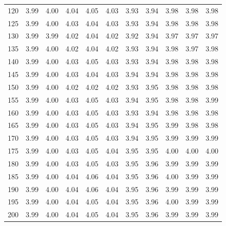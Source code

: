 \documentclass[preprint,12pt]{elsarticle}
\begin{document}
\begin{table}[ht]
\begin{tabular}{c|ccccc|ccccc}
  120 & 3.99 & 4.00 & 4.04 & 4.05 & 4.03 & 3.93 & 3.94 & 3.98 & 3.98 & 3.98 \\ 
  125 & 3.99 & 4.00 & 4.03 & 4.04 & 4.03 & 3.93 & 3.94 & 3.98 & 3.98 & 3.98 \\ 
  130 & 3.99 & 3.99 & 4.02 & 4.04 & 4.02 & 3.92 & 3.94 & 3.97 & 3.97 & 3.97 \\ 
  135 & 3.99 & 4.00 & 4.02 & 4.04 & 4.02 & 3.93 & 3.94 & 3.98 & 3.97 & 3.98 \\ 
  140 & 3.99 & 4.00 & 4.03 & 4.05 & 4.03 & 3.93 & 3.94 & 3.98 & 3.98 & 3.98 \\ 
  145 & 3.99 & 4.00 & 4.03 & 4.04 & 4.03 & 3.94 & 3.94 & 3.98 & 3.98 & 3.98 \\ 
  150 & 3.99 & 4.00 & 4.02 & 4.02 & 4.02 & 3.93 & 3.95 & 3.98 & 3.98 & 3.98 \\ 
  155 & 3.99 & 4.00 & 4.03 & 4.05 & 4.03 & 3.94 & 3.95 & 3.98 & 3.98 & 3.99 \\ 
  160 & 3.99 & 4.00 & 4.03 & 4.05 & 4.03 & 3.93 & 3.94 & 3.98 & 3.98 & 3.98 \\ 
  165 & 3.99 & 4.00 & 4.03 & 4.05 & 4.03 & 3.94 & 3.95 & 3.99 & 3.98 & 3.98 \\ 
  170 & 3.99 & 4.00 & 4.03 & 4.05 & 4.03 & 3.94 & 3.95 & 3.99 & 3.99 & 3.99 \\ 
  175 & 3.99 & 4.00 & 4.03 & 4.05 & 4.04 & 3.95 & 3.95 & 4.00 & 4.00 & 4.00 \\ 
  180 & 3.99 & 4.00 & 4.03 & 4.05 & 4.03 & 3.95 & 3.96 & 3.99 & 3.99 & 3.99 \\ 
  185 & 3.99 & 4.00 & 4.04 & 4.06 & 4.04 & 3.95 & 3.96 & 4.00 & 3.99 & 3.99 \\ 
  190 & 3.99 & 4.00 & 4.04 & 4.06 & 4.04 & 3.95 & 3.96 & 3.99 & 3.99 & 3.99 \\ 
  195 & 3.99 & 4.00 & 4.04 & 4.05 & 4.04 & 3.95 & 3.96 & 4.00 & 3.99 & 3.99 \\ 
  200 & 3.99 & 4.00 & 4.04 & 4.05 & 4.04 & 3.95 & 3.96 & 3.99 & 3.99 & 3.99 \\ 
   \hline
\end{tabular}
\label{tab:causal1}
\end{table}
\end{document}
